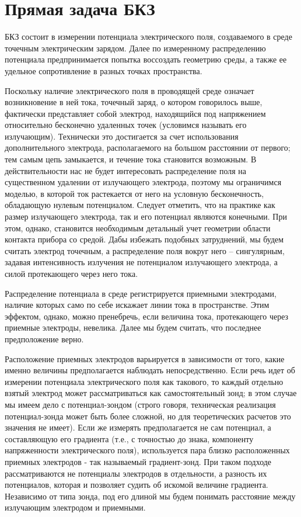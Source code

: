 \section{Прямая задача БКЗ}

БКЗ состоит в измерении
потенциала электрического поля, создаваемого в среде точечным электрическим зарядом.
Далее по измеренному распределению потенциала предпринимается попытка воссоздать
геометрию среды, а также ее удельное сопротивление в разных точках пространства.

Поскольку наличие электрического поля в проводящей среде означает
возникновение в ней тока, точечный заряд, о котором говорилось выше, фактически
представляет собой электрод, находящийся под напряжением относительно бесконечно
удаленных точек (условимся называть его излучающим). Технически это достигается за
счет использования дополнительного электрода, располагаемого на большом расстоянии от
первого; тем самым цепь замыкается, и течение тока становится возможным. В
действительности нас не будет интересовать распределение поля на существенном
удалении от излучающего электрода, поэтому мы ограничимся моделью, в которой ток
растекается от него на условную бесконечность, обладающую нулевым потенциалом.
Следует отметить, что на практике как размер излучающего электрода, так и его потенциал
являются конечными. При этом, однако, становится необходимым детальный учет
геометрии области контакта прибора со средой. Дабы избежать подобных затруднений, мы
будем считать электрод точечным, а распределение поля вокруг него – сингулярным,
задавая интенсивность излучения не потенциалом излучающего электрода, а силой
протекающего через него тока.

Распределение потенциала в среде регистрируется приемными электродами,
наличие которых само по себе искажает линии тока в пространстве. Этим эффектом,
однако, можно пренебречь, если величина тока, протекающего через приемные электроды,
невелика. Далее мы будем считать, что последнее предположение верно.

Расположение приемных электродов варьируется в зависимости от того, какие
именно величины предполагается наблюдать непосредственно. Если речь идет об
измерении потенциала электрического поля как такового, то каждый отдельно взятый
электрод может рассматриваться как самостоятельный зонд; в этом случае мы имеем дело
с потенциал-зондом (строго говоря, техническая реализация потенциал-зонда может быть
более сложной, но для теоретических расчетов это значения не имеет). Если же измерять
предполагается не сам потенциал, а составляющую его градиента (т.е., с точностью до
знака, компоненту напряженности электрического поля), используется пара близко
расположенных приемных электродов - так называемый градиент-зонд. При таком подходе
рассматриваются не потенциалы электродов в отдельности, а разность их потенциалов,
которая и позволяет судить об искомой величине градиента. Независимо от типа зонда, под
его длиной мы будем понимать расстояние между излучающим электродом и приемными.


